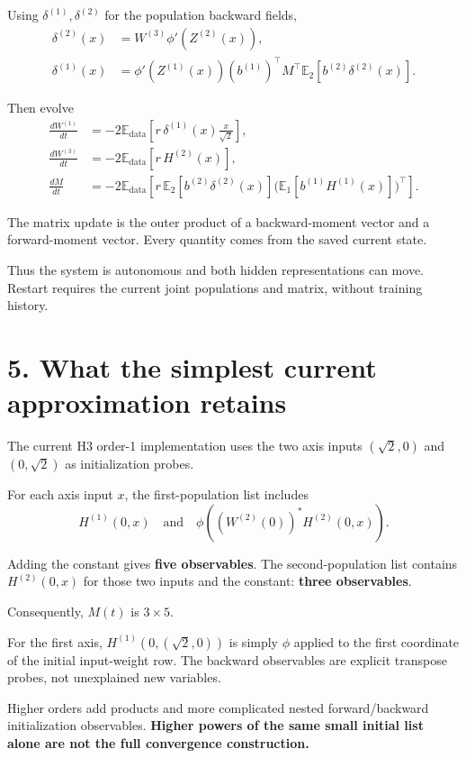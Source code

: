 \documentclass[11pt,a4paper]{scrartcl}
\begin{document}
Using \(\delta^{(1)},\delta^{(2)}\) for the population backward fields,
\[
\begin{aligned}
\delta^{(2)}(x)
&=W^{(3)}\phi'(Z^{(2)}(x)),\\
\delta^{(1)}(x)
&=\phi'(Z^{(1)}(x))(b^{(1)})^\top M^\top
       \mathbb E_2[b^{(2)}\delta^{(2)}(x)].
\end{aligned}
\]

Then evolve
\[
\begin{aligned}
\frac{dW^{(1)}}{dt}
&=-2\mathbb E_{\mathrm{data}}
   \left[r\,\delta^{(1)}(x)\frac{x}{\sqrt2}\right],\\[4pt]
\frac{dW^{(3)}}{dt}
&=-2\mathbb E_{\mathrm{data}}[r\,H^{(2)}(x)],\\[4pt]
\frac{dM}{dt}
&=-2\mathbb E_{\mathrm{data}}\!\left[
r\,\mathbb E_2[b^{(2)}\delta^{(2)}(x)]
\bigl(\mathbb E_1[b^{(1)}H^{(1)}(x)]\bigr)^\top
\right].
\end{aligned}
\]

The matrix update is the outer product of a backward-moment vector and a forward-moment vector. Every quantity comes from the saved current state.

Thus the system is autonomous and both hidden representations can move. Restart requires the current joint populations and matrix, without training history.

\section{5. What the simplest current approximation retains}

The current H3 order-1 implementation uses the two axis inputs \((\sqrt2,0)\) and \((0,\sqrt2)\) as initialization probes.

For each axis input \(x\), the first-population list includes
\[
H^{(1)}(0,x)
\quad\text{and}\quad
\phi\!\left((W^{(2)}(0))^*H^{(2)}(0,x)\right).
\]

Adding the constant gives \textbf{five observables}. The second-population list contains \(H^{(2)}(0,x)\) for those two inputs and the constant: \textbf{three observables}.

Consequently, \(M(t)\) is \(3\times5\).

For the first axis, \(H^{(1)}(0,(\sqrt2,0))\) is simply \(\phi\) applied to the first coordinate of the initial input-weight row. The backward observables are explicit transpose probes, not unexplained new variables.

Higher orders add products and more complicated nested forward/backward initialization observables. \textbf{Higher powers of the same small initial list alone are not the full convergence construction.}
\end{document}
